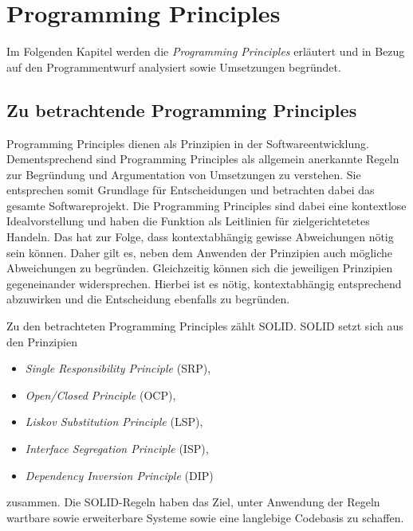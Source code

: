 \chapter{Programming Principles}
Im Folgenden Kapitel werden die \textit{Programming Principles} erläutert und in Bezug auf den Programmentwurf analysiert sowie Umsetzungen begründet.

\section{Zu betrachtende Programming Principles}
Programming Principles dienen als Prinzipien in der Softwareentwicklung.
Dementsprechend sind Programming Principles als allgemein anerkannte Regeln zur Begründung und Argumentation von Umsetzungen zu verstehen.
Sie entsprechen somit Grundlage für Entscheidungen und betrachten dabei das gesamte Softwareprojekt.
Die Programming Principles sind dabei eine kontextlose Idealvorstellung und haben die Funktion als Leitlinien für zielgerichtetetes Handeln.
Das hat zur Folge, dass kontextabhängig gewisse Abweichungen nötig sein können.
Daher gilt es, neben dem Anwenden der Prinzipien auch mögliche Abweichungen zu begründen.
Gleichzeitig können sich die jeweiligen Prinzipien gegeneinander widersprechen.
Hierbei ist es nötig, kontextabhängig entsprechend abzuwirken und die Entscheidung ebenfalls zu begründen.

Zu den betrachteten Programming Principles zählt SOLID.
SOLID setzt sich aus den Prinzipien
\begin{itemize}
    \item \textit{Single Responsibility Principle} (SRP),
    \item \textit{Open/Closed Principle} (OCP),
    \item \textit{Liskov Substitution Principle} (LSP),
    \item \textit{Interface Segregation Principle} (ISP),
    \item \textit{Dependency Inversion Principle} (DIP)
  \end{itemize}
zusammen.
Die SOLID-Regeln haben das Ziel, unter Anwendung der Regeln wartbare sowie erweiterbare Systeme sowie eine langlebige Codebasis zu schaffen.

